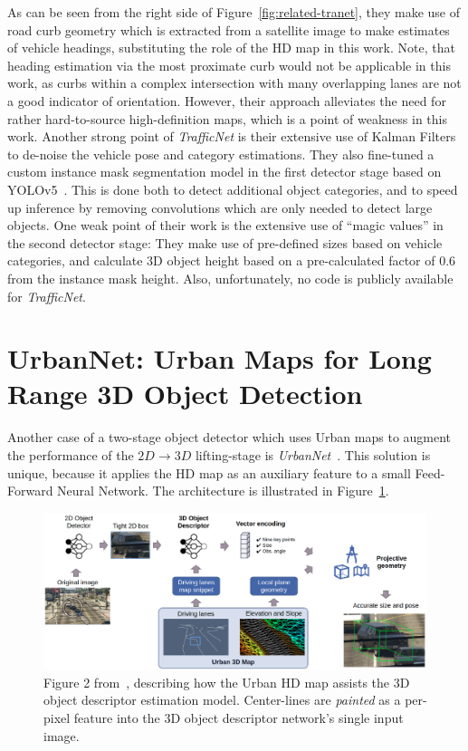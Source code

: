 As can be seen from the right side of Figure~\ref{fig:related-tranet}, they make use of road curb geometry which is extracted from a satellite image to make estimates of vehicle headings, substituting the role of the HD map in this work.
Note, that heading estimation via the most proximate curb would not be applicable in this work, as curbs within a complex intersection with many overlapping lanes are not a good indicator of orientation.
However, their approach alleviates the need for rather hard-to-source high-definition maps, which is a point of weakness in this work.
Another strong point of \textit{TrafficNet} is their extensive use of Kalman Filters~\cite{welch1995kalman} to de-noise the vehicle pose and category estimations.
They also fine-tuned a custom instance mask segmentation model in the first detector stage based on YOLOv5~\cite{glenn_jocher_2020_4154370}.
This is done both to detect additional object categories, and to speed up inference by removing convolutions which are only needed to detect large objects.
One weak point of their work is the extensive use of \enquote{magic values} in the second detector stage: They make use of pre-defined sizes based on vehicle categories, and calculate 3D object height based on a pre-calculated factor of \textit{$0.6$} from the instance mask height.
Also, unfortunately, no code is publicly available for \textit{TrafficNet}.

\section{UrbanNet: Urban Maps for Long Range 3D Object Detection}
\label{sec:related-urbnet}

Another case of a two-stage object detector which uses Urban maps to augment the performance of the $2D \rightarrow 3D$ lifting-stage is \textit{UrbanNet}~\cite{carrillo2021urbannet}.
This solution is unique, because it applies the HD map as an auxiliary feature to a small Feed-Forward Neural Network.
The architecture is illustrated in Figure~\ref{fig:related-urbnet}.

\begin{figure}[htb]
    \centering
    \includegraphics[width=1.0\linewidth]{figures/urbannet_architecture}
    \caption{Figure 2 from~\cite{carrillo2021urbannet}, describing how the Urban HD map assists the 3D object descriptor estimation model. Center-lines are \textit{painted} as a per-pixel feature into the 3D object descriptor network's single input image.}
    \label{fig:related-urbnet}
\end{figure}

